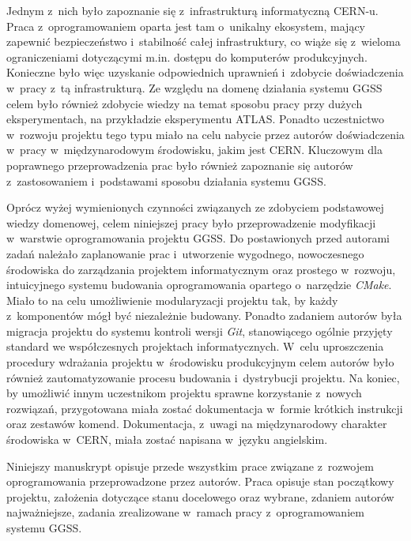 Jednym z~nich było zapoznanie się z~infrastrukturą informatyczną CERN-u. Praca z~oprogramowaniem oparta jest tam o~unikalny ekosystem, mający zapewnić bezpieczeństwo i~stabilność całej infrastruktury, co wiąże się z~wieloma ograniczeniami dotyczącymi m.in. dostępu do komputerów produkcyjnych. Konieczne było więc uzyskanie odpowiednich uprawnień i~zdobycie doświadczenia w~pracy z~tą infrastrukturą. Ze względu na domenę działania systemu GGSS celem było również zdobycie wiedzy na temat sposobu pracy przy dużych eksperymentach, na przykładzie eksperymentu ATLAS. Ponadto uczestnictwo w~rozwoju projektu tego typu miało na celu nabycie przez autorów doświadczenia w~pracy w~międzynarodowym środowisku, jakim jest CERN. Kluczowym dla poprawnego przeprowadzenia prac było również zapoznanie się autorów z~zastosowaniem i~podstawami sposobu działania systemu GGSS. \par

Oprócz wyżej wymienionych czynności związanych ze zdobyciem podstawowej wiedzy domenowej, celem niniejszej pracy było przeprowadzenie modyfikacji w~warstwie oprogramowania projektu GGSS. Do postawionych przed autorami zadań należało zaplanowanie prac i~utworzenie wygodnego, nowoczesnego środowiska do zarządzania projektem informatycznym oraz prostego w~rozwoju, intuicyjnego systemu budowania oprogramowania opartego o~narzędzie \textit{CMake}. Miało to na celu umożliwienie modularyzacji projektu tak, by każdy z~komponentów mógł być niezależnie budowany. Ponadto zadaniem autorów była migracja projektu do systemu kontroli wersji \textit{Git}, stanowiącego ogólnie przyjęty standard we współczesnych projektach informatycznych. W~celu uproszczenia procedury wdrażania projektu w~środowisku produkcyjnym celem autorów było również zautomatyzowanie procesu budowania i~dystrybucji projektu. Na koniec, by umożliwić innym uczestnikom projektu sprawne korzystanie z~nowych rozwiązań, przygotowana miała zostać dokumentacja w~formie krótkich instrukcji oraz zestawów komend. Dokumentacja, z~uwagi na międzynarodowy charakter środowiska w~CERN, miała zostać napisana w~języku angielskim. \par

Niniejszy manuskrypt opisuje przede wszystkim prace związane z~rozwojem oprogramowania przeprowadzone przez autorów. Praca opisuje stan początkowy projektu, założenia dotyczące stanu docelowego oraz wybrane, zdaniem autorów najważniejsze, zadania zrealizowane w~ramach pracy z~oprogramowaniem systemu GGSS.